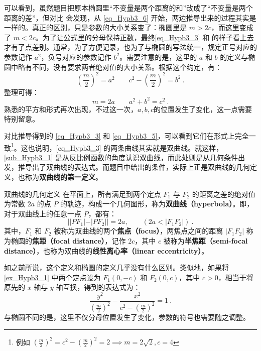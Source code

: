 可以看到，虽然题目把原本椭圆里“不变量是两个距离的和”改成了“不变量是两个距离的差”，但对比  会发现，从 \autoref{eq_Hypb3_6} 开始，两边推导出来的过程其实是一样的。真正的区别，只是参数的大小关系变了：椭圆里是 $m>2c$，而这里变成了 $m<2c$。为了让公式里的分母保持正数，最终\autoref{eq_Hypb3_3} 和  的样子看上去才有了点差别。通常，为了方便记录，也为了与椭圆的写法统一，规定正号对应的参数记作 $a^2$，负号对应的参数记作 $b^2$。需要注意的是，这里的 $a$ 和 $b$ 的定义与椭圆中略有不同，没有要求两者绝对值的大小关系。根据这个约定，有：
\begin{equation}\label{eq_Hypb3_10}
\left(\displaystyle\frac{m}{2}\right)^2=a^2\qquad c^2-\displaystyle\left(\frac{m}{2}\right)^2=b^2~.
\end{equation}
整理可得：
\begin{equation}
m=2a\qquad a^2+b^2=c^2~.
\end{equation}
熟悉的平方和形式再次出现，不过这一次，$a,b,c$的位置发生了变化，这一点需要特别留意。

对比推导得到的 \autoref{eq_Hypb3_3} 和 \autoref{eq_Hypb3_5}，可以看到它们在形式上完全一致\footnote{例如 $\left( \frac{m}{2} \right)^2 = c^2 - \left( \frac{m}{2} \right)^2 = 2\implies m = 2\sqrt{2}, c = 4$}。这也说明，\autoref{eq_Hypb3_3} 的两条曲线其实就是双曲线。就这样，\autoref{sub_Hypb3_1} 是从反比例函数的角度认识双曲线，而此处则是从几何条件出发，推导出了双曲线的表达式。而题目中给出的条件，实际上正是双曲线的几何定义，也称为\textbf{双曲线的第一定义}。

\begin{definition}{双曲线的几何定义}
在平面上，所有满足到两个定点 $F_1$ 与 $F_2$ 的距离之差的绝对值为常数 $2a$ 的点 $P$ 的轨迹，构成一个几何图形，称为\textbf{双曲线（hyperbola）}。即，对于双曲线上的任意一点 $P$，都有：
\begin{equation}
||PF_1| - |PF_2|| = 2a ,\qquad(2a<|F_1F_2|)~.
\end{equation}
其中，$F_1$ 和 $F_2$ 被称为双曲线的两个\textbf{焦点（focus）}，两焦点之间的距离 $|F_1F_2|$ 称为椭圆的\textbf{焦距（focal distance）}，记作 $2c$，其中 $c$ 被称为\textbf{半焦距（semi-focal distance）}，也称为双曲线的\textbf{线性离心率（linear eccentricity）}。
\end{definition}

如之前所说，这个定义和椭圆的定义几乎没有什么区别。类似地，如果将 \autoref{ex_Hypb3_1} 中两个定点设为 $F_1(0,-c)$ 和 $F_2(0,c)$，其中 $c>0$，相当于将原先的 $x$ 轴与 $y$ 轴互换，得到的表达式为：
\begin{equation}\label{eq_Hypb3_7}
\frac{y^2}{\left(\displaystyle\frac{m}{2}\right)^2}-\frac{x^2}{\displaystyle c^2-\left(\frac{m}{2}\right)^2} =1~.
\end{equation}
与椭圆不同的是，这里不仅分母位置发生了变化，参数的符号也需要随之调整。

